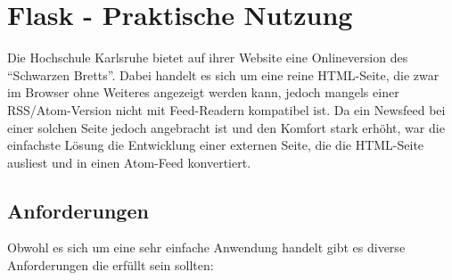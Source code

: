 \chapter{Flask - Praktische Nutzung}

Die Hochschule Karlsruhe bietet auf ihrer Website eine Onlineversion des \enquote{Schwarzen Bretts}.
Dabei handelt es sich um eine reine HTML-Seite, die zwar im Browser ohne Weiteres angezeigt werden
kann, jedoch mangels einer RSS/Atom-Version nicht mit Feed-Readern kompatibel ist. Da ein Newsfeed
bei einer solchen Seite jedoch angebracht ist und den Komfort stark erhöht, war die einfachste
Lösung die Entwicklung einer externen Seite, die die HTML-Seite ausliest und in einen Atom-Feed
konvertiert.

\section{Anforderungen}

Obwohl es sich um eine sehr einfache Anwendung handelt gibt es diverse Anforderungen die erfüllt
sein sollten:

